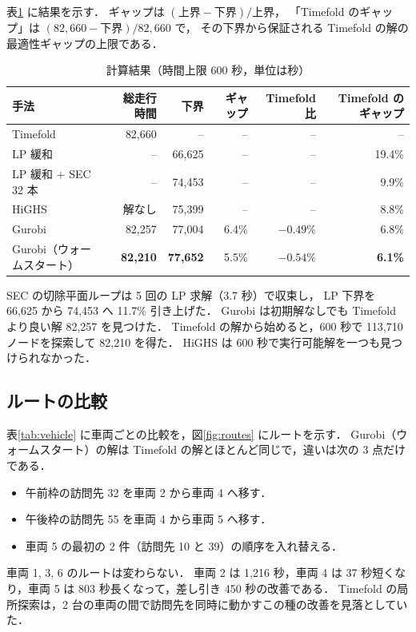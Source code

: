 \documentclass[11pt,a4paper]{ltjsarticle}
\begin{document}
表\ref{tab:result} に結果を示す．
ギャップは $(\text{上界}-\text{下界})/\text{上界}$，
「Timefold のギャップ」は $(82{,}660 - \text{下界})/82{,}660$ で，
その下界から保証される Timefold の解の最適性ギャップの上限である．

\begin{table}[htbp]
  \centering
  \caption{計算結果（時間上限 600 秒，単位は秒）}
  \label{tab:result}
  \small
  \begin{tabular}{lrrrrr}
    \toprule
    手法 & 総走行時間 & 下界 & ギャップ & Timefold 比 & Timefold のギャップ \\
    \midrule
    Timefold & 82,660 & -- & -- & -- & -- \\
    LP 緩和 & -- & 66,625 & -- & -- & 19.4\% \\
    LP 緩和 + SEC 32 本 & -- & 74,453 & -- & -- & 9.9\% \\
    HiGHS & 解なし & 75,399 & -- & -- & 8.8\% \\
    Gurobi & 82,257 & 77,004 & 6.4\% & $-0.49\%$ & 6.8\% \\
    Gurobi（ウォームスタート） & \textbf{82,210} & \textbf{77,652} & 5.5\% & $\mathbf{-0.54\%}$ & \textbf{6.1\%} \\
    \bottomrule
  \end{tabular}
\end{table}

SEC の切除平面ループは 5 回の LP 求解（3.7 秒）で収束し，
LP 下界を 66,625 から 74,453 へ 11.7\% 引き上げた．
Gurobi は初期解なしでも Timefold より良い解 82,257 を見つけた．
Timefold の解から始めると，600 秒で 113,710 ノードを探索して 82,210 を得た．
HiGHS は 600 秒で実行可能解を一つも見つけられなかった．

\subsection{ルートの比較}

表\ref{tab:vehicle} に車両ごとの比較を，図\ref{fig:routes} にルートを示す．
Gurobi（ウォームスタート）の解は Timefold の解とほとんど同じで，違いは次の 3 点だけである．
\begin{itemize}
  \item 午前枠の訪問先 32 を車両 2 から車両 4 へ移す．
  \item 午後枠の訪問先 55 を車両 4 から車両 5 へ移す．
  \item 車両 5 の最初の 2 件（訪問先 10 と 39）の順序を入れ替える．
\end{itemize}
車両 1, 3, 6 のルートは変わらない．
車両 2 は 1,216 秒，車両 4 は 37 秒短くなり，車両 5 は 803 秒長くなって，差し引き 450 秒の改善である．
Timefold の局所探索は，2 台の車両の間で訪問先を同時に動かすこの種の改善を見落としていた．
\end{document}
